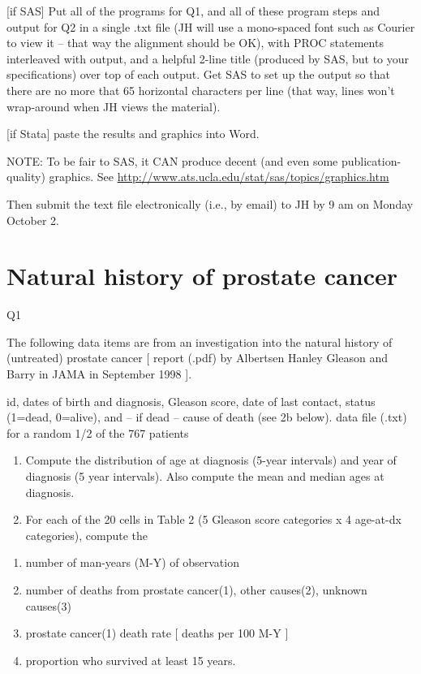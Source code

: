 \documentclass[]{book}
\begin{document}
{[}if SAS{]} Put all of the programs for Q1, and all of these program steps and output for Q2 in a single .txt file (JH will use a mono-spaced font such as Courier to view it -- that way the alignment should be OK), with PROC statements interleaved with output, and a helpful 2-line title (produced by SAS, but to your specifications) over top of each output. Get SAS to set up the output so that there are no more that 65 horizontal characters per line (that way, lines won't wrap-around when JH views the material).

{[}if Stata{]} paste the results and graphics into Word.

NOTE: To be fair to SAS, it CAN produce decent (and even some publication-quality) graphics. See \url{http://www.ats.ucla.edu/stat/sas/topics/graphics.htm}

Then submit the text file electronically (i.e., by email) to JH by 9 am on Monday October 2.

\hypertarget{natural-history-of-prostate-cancer-1}{%
\section{Natural history of prostate cancer}\label{natural-history-of-prostate-cancer-1}}

Q1

The following data items are from an investigation into the natural history of (untreated) prostate cancer {[} report (.pdf) by Albertsen Hanley Gleason and Barry in JAMA in September 1998 {]}.

id, dates of birth and diagnosis, Gleason score, date of last contact, status (1=dead, 0=alive), and -- if dead -- cause of death (see 2b below). data file (.txt) for a random 1/2 of the 767 patients

\begin{enumerate}
\def\labelenumi{\arabic{enumi}.}
\item
  Compute the distribution of age at diagnosis (5-year intervals) and year of diagnosis (5 year intervals). Also compute the mean and median ages at diagnosis.
\item
  For each of the 20 cells in Table 2 (5 Gleason score categories x 4 age-at-dx categories), compute the
\end{enumerate}

\begin{enumerate}
\def\labelenumi{\alph{enumi}.}
\item
  number of man-years (M-Y) of observation
\item
  number of deaths from prostate cancer(1), other causes(2), unknown causes(3)
\item
  prostate cancer(1) death rate {[} deaths per 100 M-Y {]}
\item
  proportion who survived at least 15 years.
\end{enumerate}
\end{document}
